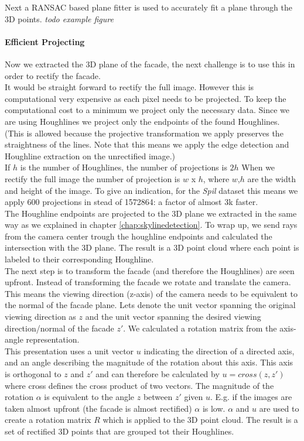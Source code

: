 Next a RANSAC based plane fitter is used to accurately fit a plane through
the 3D points. 
\emph{todo example figure}

\paragraph{Efficient Projecting} 
Now we extracted the 3D plane of the facade, the next challenge is to use this in order to rectify the facade.\\

It would be straight forward to rectify the full image. However this is
computational very expensive as each pixel needs to be projected. To keep the
computational cost to a minimum we project only the necessary data. Since we
are using Houghlines we project only the endpoints of the found Houghlines. 
(This is allowed because the projective transformation we apply preserves the
straightness of the lines. Note that this means we apply the edge detection and
Houghline extraction on the unrectified image.)\\

If $h$ is the number of Houghlines, the number of projections is $2h$
When we rectify the full image the number of projection is $w$ x $h$, where $w$,$h$ are the width and height of
the image. To give an indication, for the \emph{Spil} dataset %
this means we apply 600 projections in stead of 1572864: a factor of almost 3k faster.\\


The Houghline endpoints are projected to the 3D plane we extracted in the same
way as we explained in chapter \ref{chap:skylinedetection}. To wrap up, we send
rays from the camera center trough the houghline endpoints and calculated the
intersection with the 3D plane.  The result is a 3D point cloud where each
point is labeled to their corresponding Houghline.\\

The next step is to transform the facade (and therefore the Houghlines) are
seen upfront. Instead of transforming the facade we rotate and translate the camera. 
This means the viewing direction (z-axis) of the camera needs
to be equivalent to the normal of the facade plane. Lets denote the
unit vector spanning the original viewing direction as $z$ and the
unit vector spanning the desired viewing direction/normal of the facade $z'$.
We calculated a rotation matrix from the axis-angle representation.\\

This presentation uses a unit vector $u$ indicating the direction of a directed axis, and an
angle describing the magnitude of the rotation about this axis.
This axis is orthogonal to $z$ and $z'$ and can therefore be
calculated by $u = cross(z,z')$ where cross defines the cross product of
two vectors.
The magnitude of the rotation $\alpha$ is equivalent to the angle $z$ between $z'$ given $u$. 
E.g. if the images are taken almost upfront (the facade is almost rectified) $\alpha$ is low.
$\alpha$ and $u$ are used to create a rotation matrix $R$ which is applied to the 3D point cloud.
The result is a set of rectified 3D points that are grouped tot their Houghlines.


